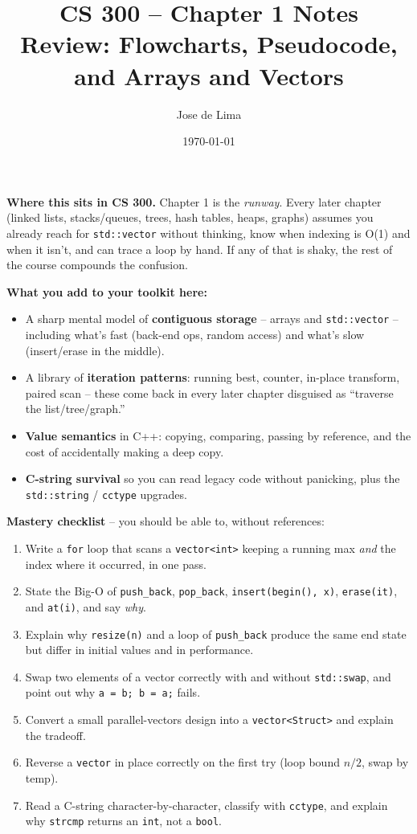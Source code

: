 \documentclass[11pt]{article}
\title{CS 300 -- Chapter 1 Notes\\\large Review: Flowcharts, Pseudocode, and Arrays and Vectors}
\author{Jose de Lima}
\date{\today}
\begin{document}
\maketitle

\begin{ideabox}
\textbf{Where this sits in CS 300.} Chapter 1 is the \emph{runway}. Every
later chapter (linked lists, stacks/queues, trees, hash tables, heaps, graphs)
assumes you already reach for \texttt{std::vector} without thinking, know
when indexing is O(1) and when it isn't, and can trace a loop by hand. If
any of that is shaky, the rest of the course compounds the confusion.

\textbf{What you add to your toolkit here:}
\begin{itemize}
    \item A sharp mental model of \textbf{contiguous storage} -- arrays and
          \texttt{std::vector} -- including what's fast (back-end ops, random
          access) and what's slow (insert/erase in the middle).
    \item A library of \textbf{iteration patterns}: running best, counter,
          in-place transform, paired scan -- these come back in every later
          chapter disguised as ``traverse the list/tree/graph.''
    \item \textbf{Value semantics} in C++: copying, comparing, passing by
          reference, and the cost of accidentally making a deep copy.
    \item \textbf{C-string survival} so you can read legacy code without
          panicking, plus the \texttt{std::string} / \texttt{cctype} upgrades.
\end{itemize}

\textbf{Mastery checklist} -- you should be able to, without references:
\begin{enumerate}
    \item Write a \texttt{for} loop that scans a \texttt{vector<int>} keeping a
          running max \emph{and} the index where it occurred, in one pass.
    \item State the Big-O of \texttt{push\_back}, \texttt{pop\_back},
          \texttt{insert(begin(), x)}, \texttt{erase(it)}, and \texttt{at(i)},
          and say \emph{why}.
    \item Explain why \texttt{resize(n)} and a loop of \texttt{push\_back}
          produce the same end state but differ in initial values and in
          performance.
    \item Swap two elements of a vector correctly with and without
          \texttt{std::swap}, and point out why \texttt{a = b;\ b = a;} fails.
    \item Convert a small parallel-vectors design into a
          \texttt{vector<Struct>} and explain the tradeoff.
    \item Reverse a \texttt{vector} in place correctly on the first try
          (loop bound $n/2$, swap by temp).
    \item Read a C-string character-by-character, classify with
          \texttt{cctype}, and explain why \texttt{strcmp} returns an
          \texttt{int}, not a \texttt{bool}.
\end{enumerate}


\end{ideabox}
\end{document}
